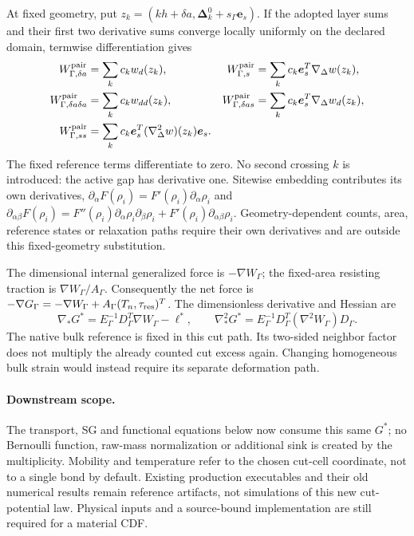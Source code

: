 \documentclass[11pt]{article}
\begin{document}
At fixed geometry, put $z_k=(kh+\delta a,\boldsymbol\Delta_k^0+s_\Gamma\boldsymbol e_s)$.
If the adopted layer sums and their first two derivative sums converge
locally uniformly on the declared domain, termwise differentiation gives
\begin{align}
 W_{\Gamma,\delta a}^{\rm pair}&=\sum_k c_k w_d(z_k),&
 W_{\Gamma,s}^{\rm pair}&=\sum_k c_k\boldsymbol e_s^T\nabla_\Delta w(z_k),\nonumber\\
 W_{\Gamma,\delta a\delta a}^{\rm pair}&=\sum_k c_k w_{dd}(z_k),&
 W_{\Gamma,\delta a s}^{\rm pair}&=\sum_k c_k\boldsymbol e_s^T\nabla_\Delta w_d(z_k),\nonumber\\
 W_{\Gamma,ss}^{\rm pair}&=\sum_k c_k\boldsymbol e_s^T
                    (\nabla_\Delta^2 w)(z_k)\boldsymbol e_s .
 \label{eq:r11-counted-derivatives}
\end{align}
The fixed reference terms differentiate to zero. No second crossing $k$ is
introduced: the active gap has derivative one. Sitewise embedding contributes
its own derivatives, $\partial_\alpha F(\rho_i)=F'(\rho_i)\partial_\alpha\rho_i$
and $\partial_{\alpha\beta}F(\rho_i)=F''(\rho_i)
\partial_\alpha\rho_i\partial_\beta\rho_i+
F'(\rho_i)\partial_{\alpha\beta}\rho_i$.
Geometry-dependent counts, area, reference states or relaxation paths require
their own derivatives and are outside this fixed-geometry substitution.

The dimensional internal generalized force is $-\nabla W_\Gamma$;
the fixed-area resisting traction is $\nabla W_\Gamma/A_\Gamma$.
Consequently the net force is
$-\nabla G_\Gamma=-\nabla W_\Gamma+A_\Gamma(T_n,\tau_{\rm res})^T$.
The dimensionless derivative and Hessian are
\begin{equation}
 \nabla_*G^*=E_\Gamma^{-1}D_\Gamma^T\nabla W_\Gamma-\ell^*,
 \qquad \nabla_*^2G^*=E_\Gamma^{-1}D_\Gamma^T
                      (\nabla^2W_\Gamma)D_\Gamma .
 \label{eq:r11-chain-work}
\end{equation}
The native bulk reference is fixed in this cut path. Its two-sided neighbor
factor does not multiply the already counted cut excess again. Changing
homogeneous bulk strain would instead require its separate deformation path.

\paragraph{Downstream scope.}
The transport, SG and functional equations below now consume this same
$G^*$; no Bernoulli function, raw-mass normalization or additional sink is
created by the multiplicity. Mobility and temperature refer to the chosen
cut-cell coordinate, not to a single bond by default. Existing production
executables and their old numerical results remain reference artifacts,
not simulations of this new cut-potential law. Physical inputs and a
source-bound implementation are still required for a material CDF.
\end{document}
